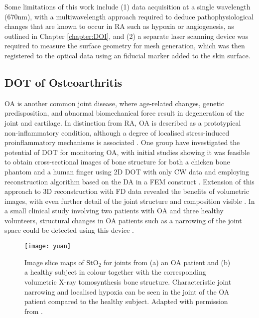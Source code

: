 \documentclass[twoside]{bhamthesis}
\theoremstyle{definition}
\begin{document}
Some limitations of this work include (1) data acquisition at a single wavelength (670nm), with a multiwavelength approach required to deduce pathophysiological changes that are known to occur in RA such as hypoxia or angiogenesis, as outlined in Chapter \ref{chapter:DOI}, and (2) a separate laser scanning device was required to measure the surface geometry for mesh generation, which was then registered to the optical data using an fiducial marker added to the skin surface.

\subsection{DOT of Osteoarthritis}

OA is another common joint disease, where age-related changes, genetic predisposition, and abnormal biomechanical force result in degeneration of the joint and cartilage. In distinction from RA, OA is described as a prototypical non-inflammatory condition, although a degree of localised stress-induced proinflammatory mechanisms is associated \cite{goldring2011inflammation}. One group have investigated the potential of DOT for monitoring OA, with initial studies showing it was feasible to obtain cross-sectional images of bone structure for both a chicken bone phantom and a human finger using 2D DOT with only CW data and employing reconstruction algorithm based on the DA in a FEM construct \cite{xu2001imaging}. Extension of this approach to 3D reconstruction with FD data revealed the benefits of volumetric images, with even further detail of the joint structure and composition visible \cite{xu2002three,zhang2005three}. In a small clinical study involving two patients with OA and three healthy volunteers, structural changes in OA patients such as a narrowing of the joint space could be detected using this device \cite{yuan2007three}.

\begin{figure}[!ht]
\texttt{[image: yuan]}
\centering
\caption{Image slice maps of $\mathrm{StO_2}$ for joints from (a) an OA patient and (b) a healthy subject in colour together with the corresponding volumetric X-ray tomosynthesis bone structure. Characteristic joint narrowing and localised hypoxia can be seen in the joint of the OA patient compared to the healthy subject. Adapted with permission from \cite{yuan2010image}.}
\centering
\label{fig:YuanExample}
\end{figure}
\end{document}
